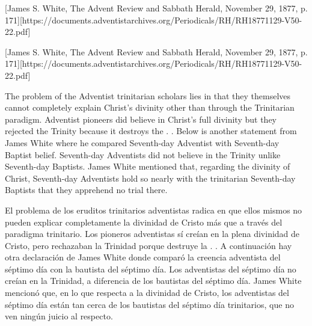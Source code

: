 

[James S. White, The Advent Review and Sabbath Herald, November 29, 1877, p. 171][https://documents.adventistarchives.org/Periodicals/RH/RH18771129-V50-22.pdf]


[James S. White, The Advent Review and Sabbath Herald, November 29, 1877, p. 171][https://documents.adventistarchives.org/Periodicals/RH/RH18771129-V50-22.pdf]


The problem of the Adventist trinitarian scholars lies in that they themselves cannot completely explain Christ’s divinity other than through the Trinitarian paradigm. Adventist pioneers did believe in Christ’s full divinity but they rejected the Trinity because it destroys the . . Below is another statement from James White where he compared Seventh-day Adventist with Seventh-day Baptist belief. Seventh-day Adventists did not believe in the Trinity unlike Seventh-day Baptists. James White mentioned that, regarding the divinity of Christ, Seventh-day Adventists hold so nearly with the trinitarian Seventh-day Baptists that they apprehend no trial there.


El problema de los eruditos trinitarios adventistas radica en que ellos mismos no pueden explicar completamente la divinidad de Cristo más que a través del paradigma trinitario. Los pioneros adventistas sí creían en la plena divinidad de Cristo, pero rechazaban la Trinidad porque destruye la . . A continuación hay otra declaración de James White donde comparó la creencia adventista del séptimo día con la bautista del séptimo día. Los adventistas del séptimo día no creían en la Trinidad, a diferencia de los bautistas del séptimo día. James White mencionó que, en lo que respecta a la divinidad de Cristo, los adventistas del séptimo día están tan cerca de los bautistas del séptimo día trinitarios, que no ven ningún juicio al respecto.


